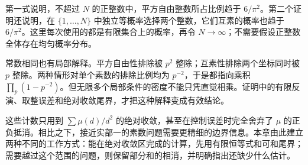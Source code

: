 第一式说明，不超过 \(N\) 的正整数中，平方自由整数所占比例趋于 \(6/\pi^2\)。第二个证明还说明，在 \(\{1,\ldots,N\}\) 中独立等概率选择两个整数，它们互素的概率也趋于 \(6/\pi^2\)。这里每次使用的都是有限集合上的概率，再令 \(N\to\infty\)；不需要假设正整数全体存在均匀概率分布。

常数相同也有局部解释。平方自由性排除被 \(p^2\) 整除；互素性排除两个坐标同时被 \(p\) 整除。两种情形对单个素数的排除比例均为 \(p^{-2}\)，于是都指向乘积 \(\prod_p(1-p^{-2})\)。但无限多个局部条件的密度不能只凭直觉相乘。证明中的有限反演、取整误差和绝对收敛尾界，才把这种解释变成有效结论。

这些计数只用到 \(\sum\mu(d)/d^2\) 的绝对收敛，甚至在控制误差时完全舍弃了 \(\mu\) 的正负抵消。相比之下，接近实部一的素数问题需要更精细的边界信息。本章由此建立两种不同的工作方式：能在绝对收敛区完成的计算，先用有限恒等式和可和尾界；需要越过这个范围的问题，则保留部分和的相消，并明确指出还缺少什么估计。
